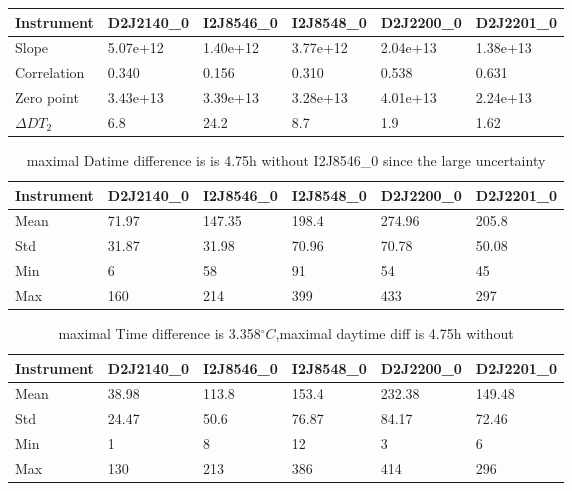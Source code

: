 \documentclass  [
  paper    = a4,
  BCOR     = 10mm,
  twoside,
  fontsize = 12pt,
  fleqn,
  toc      = bibnumbered,
  toc      = listofnumbered,
  numbers  = noendperiod,
  headings = normal,
  listof   = leveldown,
  version  = 3.03
]                                       {scrreprt}
\begin{document}
	\begin{table}[h]
		\begin{tabular}{|p{2cm}|p{2cm}|p{2cm}|p{2cm}|p{2cm}|p{2cm}|}
			Instrument	&D2J2140\_0&I2J8546\_0& I2J8548\_0&D2J2200\_0&D2J2201\_0\\
			\toprule
			Slope&5.07e+12&1.40e+12 &3.77e+12 &2.04e+13& 1.38e+13\\
			\midrule
			Correlation&
			0.340&
			0.156&
			0.310&
			0.538&
			0.631\\
			\midrule
			Zero point& 3.43e+13&3.39e+13&3.28e+13&  4.01e+13&  2.24e+13\\
			\midrule
			$\Delta DT_{2}$&6.8&24.2&8.7&1.9&1.62\\
			\bottomrule
		\end{tabular}
	\end{table}
	\begin{table}
	\begin{tabular}{|p{2cm}|p{2cm}|p{2cm}|p{2cm}|p{2cm}|p{2cm}|}
		Instrument	&D2J2140\_0&I2J8546\_0& I2J8548\_0&D2J2200\_0&D2J2201\_0\\
		\toprule
		Mean&71.97&147.35&198.4&274.96&205.8\\
		\midrule
		Std&
		31.87&
		31.98&
		70.96&
		70.78&
		50.08\\
		\midrule
		Min&6&58&91&54 &45\\
		\midrule
		Max&160&214&399&433 &297\\
		\bottomrule
	\end{tabular}
	\caption{maximal Datime difference is  is 4.75h without I2J8546\_0 since the large uncertainty}
\end{table}	


	\begin{table}
	\begin{tabular}{|p{2cm}|p{2cm}|p{2cm}|p{2cm}|p{2cm}|p{2cm}|}
		Instrument	&D2J2140\_0&I2J8546\_0& I2J8548\_0&D2J2200\_0&D2J2201\_0\\
		\toprule
		Mean&38.98&113.8&153.4&232.38&149.48\\
		\midrule
		Std&
		24.47&
		50.6&
		76.87&
		84.17&
		72.46\\
		\midrule
		Min&1&8&12&3 &6\\
		\midrule
		Max&130&213&386&414 &296\\
		\bottomrule
	\end{tabular}
	\caption{maximal Time difference is 3.358$^{\circ}C$,maximal daytime diff is 4.75h without}
\end{table}	
\end{document}
